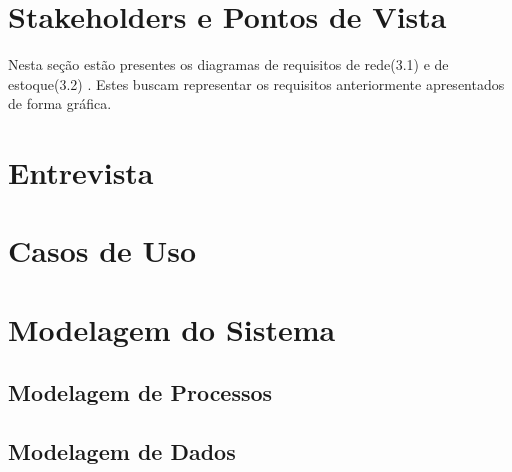 \section{Stakeholders e Pontos de Vista}
Nesta seção estão presentes os diagramas de requisitos de rede(3.1) e de estoque(3.2) . Estes
buscam representar os requisitos anteriormente apresentados de forma gráfica.


\section{Entrevista}


\section{ Casos de Uso}



\section{Modelagem do Sistema}


\subsection{Modelagem de Processos}


\subsection{Modelagem de Dados}

